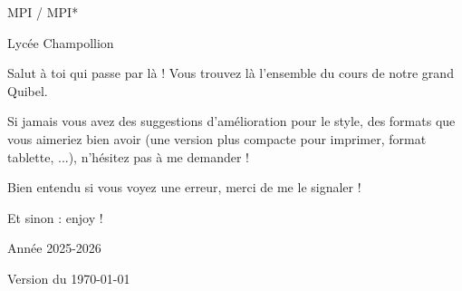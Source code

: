 \documentclass{../commun/prepacours}
\begin{document}
\begin{center}
  \vspace*{2cm}
  
  
  \vspace{1.5cm}
  {\Large MPI / MPI* \par}
  \vspace{0.5cm}
  {\large Lycée Champollion \par}
  \vspace{2cm}
  
  \begin{minipage}{0.8\textwidth}
    \vspace{0.5cm}
    
    Salut à toi qui passe par là ! Vous trouvez là l'ensemble du cours de notre grand Quibel.

    \avspace Si jamais vous avez des suggestions d'amélioration pour le style, 
    des formats que vous aimeriez bien avoir (une version plus compacte pour 
    imprimer, format tablette, ...), n'hésitez pas à me demander !

    \avspace Bien entendu si vous voyez une erreur, merci de me le signaler !

    \begin{center}
      Et sinon : enjoy !
    \end{center}
    
    \vspace{0.5cm}
  \end{minipage}
  
  \vfill
  {\Large Année 2025-2026 \par}
  \vspace{0.5cm}
  {\normalsize Version du \today \par}
  \vspace{1cm}
\end{center}
\clearpage
\end{document}
